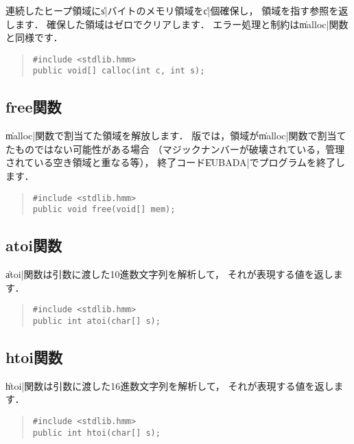 連続したヒープ領域に\|s|バイトのメモリ領域を\|c|個確保し，
領域を指す参照を返します．
確保した領域はゼロでクリアします．
エラー処理と制約は\|malloc|関数と同様です．

\begin{quote}
\begin{verbatim}
#include <stdlib.hmm>
public void[] calloc(int c, int s);
\end{verbatim}
\end{quote}

\subsection{free関数}

\|malloc|関数で割当てた領域を解放します．
{\tacos}版では，領域が\|malloc|関数で割当てたものではない可能性がある場合
（マジックナンバーが破壊されている，管理されている空き領域と重なる等），
終了コード\|EUBADA|でプログラムを終了します．

\begin{quote}
\begin{verbatim}
#include <stdlib.hmm>
public void free(void[] mem);
\end{verbatim}
\end{quote}

\subsection{atoi関数}

\|atoi|関数は引数に渡した10進数文字列を解析して，
それが表現する値を返します．

\begin{quote}
\begin{verbatim}
#include <stdlib.hmm>
public int atoi(char[] s);
\end{verbatim}
\end{quote}

\subsection{htoi関数}

\|htoi|関数は引数に渡した16進数文字列を解析して，
それが表現する値を返します．

\begin{quote}
\begin{verbatim}
#include <stdlib.hmm>
public int htoi(char[] s);
\end{verbatim}
\end{quote}

